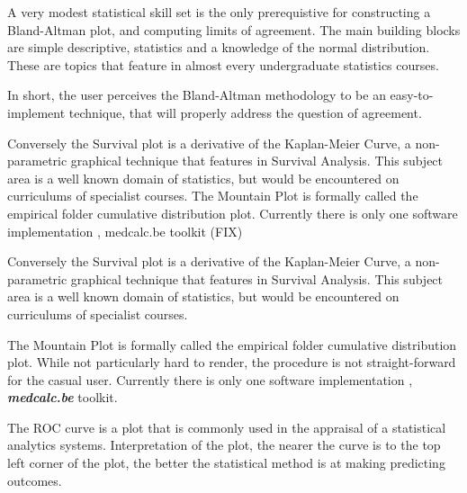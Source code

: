 \documentclass[MAIN.tex]{subfiles}
\begin{document}

\newpage
A very modest statistical skill set is the only prerequistive for constructing a Bland-Altman plot, and computing limits of agreement. The main building blocks 
are simple descriptive, statistics and a knowledge of the normal distribution. These are topics that feature in almost every undergraduate statistics courses.

In short, the user perceives the Bland-Altman methodology to be an easy-to-implement technique, that will properly address the question of agreement.

Conversely the Survival plot is a derivative of the Kaplan-Meier Curve, a non-parametric graphical technique that features in Survival Analysis. This subject area is a well known domain of statistics, but would be encountered 
on curriculums of specialist courses. The Mountain Plot is formally called the empirical folder cumulative distribution plot. 
Currently there is only one software implementation , medcalc.be toolkit (FIX)

Conversely the Survival plot is a derivative of the Kaplan-Meier Curve, a non-parametric graphical technique that features in Survival Analysis. This subject area is a well known domain of statistics, but would be encountered 
on curriculums of specialist courses. 

The Mountain Plot is formally called the empirical folder cumulative distribution plot. While not particularly hard to render, the procedure is not straight-forward for the casual user. Currently there is only one software implementation , \textbf{\textit{medcalc.be}} toolkit.





The ROC curve is a plot that is commonly used in the appraisal of a statistical analytics systems. Interpretation of the plot, the nearer the curve is to the
top left corner of the plot, the better the statistical method is at making predicting outcomes.




\end{document}
